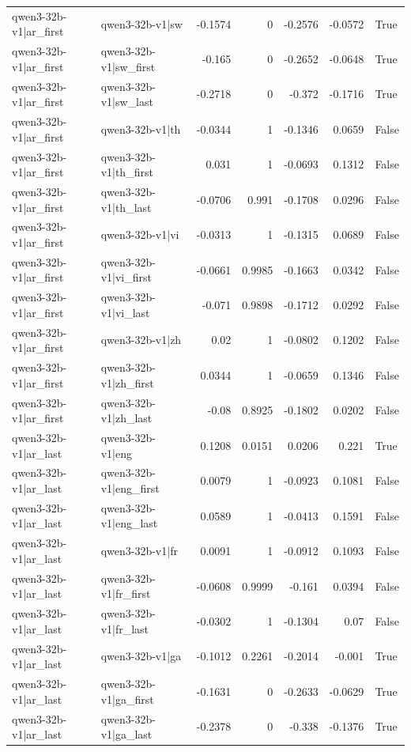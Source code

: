 \begin{table}
\begin{tabular}{l l r r r r l}
qwen3-32b-v1|ar_first & qwen3-32b-v1|sw & -0.1574 & 0 & -0.2576 & -0.0572 & True \\
qwen3-32b-v1|ar_first & qwen3-32b-v1|sw_first & -0.165 & 0 & -0.2652 & -0.0648 & True \\
qwen3-32b-v1|ar_first & qwen3-32b-v1|sw_last & -0.2718 & 0 & -0.372 & -0.1716 & True \\
qwen3-32b-v1|ar_first & qwen3-32b-v1|th & -0.0344 & 1 & -0.1346 & 0.0659 & False \\
qwen3-32b-v1|ar_first & qwen3-32b-v1|th_first & 0.031 & 1 & -0.0693 & 0.1312 & False \\
qwen3-32b-v1|ar_first & qwen3-32b-v1|th_last & -0.0706 & 0.991 & -0.1708 & 0.0296 & False \\
qwen3-32b-v1|ar_first & qwen3-32b-v1|vi & -0.0313 & 1 & -0.1315 & 0.0689 & False \\
qwen3-32b-v1|ar_first & qwen3-32b-v1|vi_first & -0.0661 & 0.9985 & -0.1663 & 0.0342 & False \\
qwen3-32b-v1|ar_first & qwen3-32b-v1|vi_last & -0.071 & 0.9898 & -0.1712 & 0.0292 & False \\
qwen3-32b-v1|ar_first & qwen3-32b-v1|zh & 0.02 & 1 & -0.0802 & 0.1202 & False \\
qwen3-32b-v1|ar_first & qwen3-32b-v1|zh_first & 0.0344 & 1 & -0.0659 & 0.1346 & False \\
qwen3-32b-v1|ar_first & qwen3-32b-v1|zh_last & -0.08 & 0.8925 & -0.1802 & 0.0202 & False \\
qwen3-32b-v1|ar_last & qwen3-32b-v1|eng & 0.1208 & 0.0151 & 0.0206 & 0.221 & True \\
qwen3-32b-v1|ar_last & qwen3-32b-v1|eng_first & 0.0079 & 1 & -0.0923 & 0.1081 & False \\
qwen3-32b-v1|ar_last & qwen3-32b-v1|eng_last & 0.0589 & 1 & -0.0413 & 0.1591 & False \\
qwen3-32b-v1|ar_last & qwen3-32b-v1|fr & 0.0091 & 1 & -0.0912 & 0.1093 & False \\
qwen3-32b-v1|ar_last & qwen3-32b-v1|fr_first & -0.0608 & 0.9999 & -0.161 & 0.0394 & False \\
qwen3-32b-v1|ar_last & qwen3-32b-v1|fr_last & -0.0302 & 1 & -0.1304 & 0.07 & False \\
qwen3-32b-v1|ar_last & qwen3-32b-v1|ga & -0.1012 & 0.2261 & -0.2014 & -0.001 & True \\
qwen3-32b-v1|ar_last & qwen3-32b-v1|ga_first & -0.1631 & 0 & -0.2633 & -0.0629 & True \\
qwen3-32b-v1|ar_last & qwen3-32b-v1|ga_last & -0.2378 & 0 & -0.338 & -0.1376 & True \\

\end{tabular}
\end{table}
